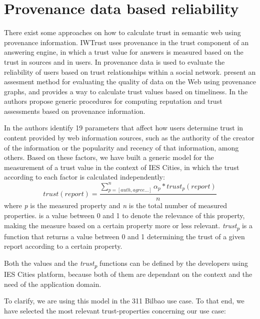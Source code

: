 \section{Provenance data based reliability}
\label{sec:provenance}

There exist some approaches on how to calculate trust in semantic web using provenance information. IWTrust \cite{zaihrayeu2005iwtrust} uses provenance in the trust component of an answering engine, in which a trust value for answers is measured based on the trust in sources and in users. In \cite{golbeck2006combining} provenance data is used to evaluate the reliability of users based on trust relationships within a social network. \cite{Hartig09usingweb} present an assesment method for evaluating the quality of data on the Web using provenance graphs, and provides a way to calculate trust values based on timeliness. In \cite{CeolinGHNF12} the authors propose generic procedures for computing reputation and trust assessments based on provenance information. 

In \cite{gil2007towards} the authors identify 19 parameters that affect how users determine trust in content provided by web information sources, such as the authority of the creator of the information or the popularity and recency of that information, among others. Based on these factors, we have built a generic model for the measurement of a trust value in the context of IES Cities, in which the trust according to each factor is calculated independently:
%
\begin{equation}
trust(report) = \frac{\sum_{p=[auth, agree...]}^{n} \alpha_p * trust_p(report)}{n}
\end{equation}
%
where \textit{p} is the measured property and \textit{n} is the total number of measured properties. {\textalpha} is a value between 0 and 1 to denote the relevance of this property, making the measure based on a certain property more or less relevant. \textit{trust\textsubscript{p}} is a function that returns a value between 0 and 1 determining the trust of a given report according to a certain property.

Both the \textalpha values and the \textit{trust\textsubscript{p}} functions can be defined by the developers using IES Cities platform, because both of them are dependant on the context and the need of the application domain.

To clarify, we are using this model in the 311 Bilbao use case. To that end, we have selected the most relevant trust-properties concerning our use case:

